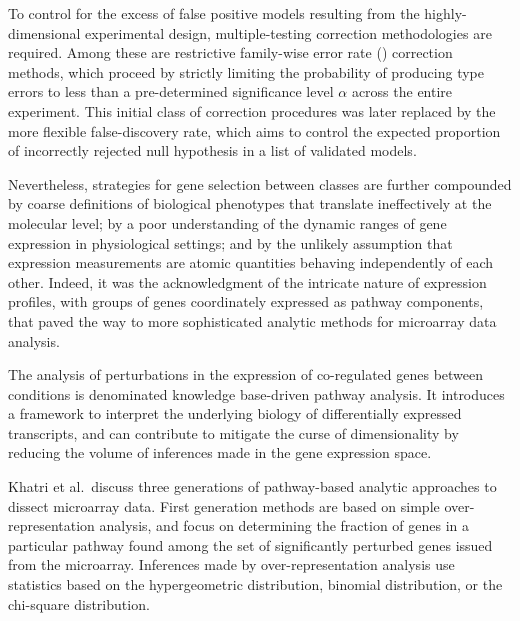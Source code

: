 To control for the excess of false positive models resulting from the
highly-dimensional experimental design, multiple-testing correction
methodologies are required.  Among these are restrictive family-wise error rate
() correction methods, which proceed by strictly limiting the
probability of producing type  errors to less than a pre-determined
significance level $\alpha$ across the entire experiment.  This initial class of
correction procedures was later replaced by the more flexible false-discovery
rate,\cite{benjamini_controlling_1995} which aims to control the expected
proportion of incorrectly rejected null hypothesis in a list of validated
models.

Nevertheless, strategies for gene selection between classes are further
compounded by coarse definitions of biological phenotypes that translate
ineffectively at the molecular level;\cite{piatetsky-shapiro_microarray_2003} by
a poor understanding of the dynamic ranges of gene expression in physiological
settings;\cite{nadimpally_novel_2003} and by the unlikely assumption that
expression measurements are atomic quantities behaving independently of each
other.\cite{piatetsky-shapiro_microarray_2003} Indeed, it was the
acknowledgment of the intricate nature of expression profiles, with groups of
genes coordinately expressed as pathway components, that paved the way to more
sophisticated analytic methods for microarray data analysis.

The analysis of perturbations in the expression of co-regulated genes between
conditions is denominated knowledge base-driven pathway analysis.  It introduces
a framework to interpret the underlying biology of differentially expressed
transcripts, and can contribute to mitigate the curse of dimensionality by
reducing the volume of inferences made in the gene expression space.

Khatri et al.~discuss three generations of pathway-based analytic approaches to
dissect microarray data.\cite{khatri_ten_2012} First generation methods are
based on simple over-representation analysis, and focus on determining the
fraction of genes in a particular pathway found among the set of significantly
perturbed genes issued from the microarray.  Inferences made by
over-representation analysis use statistics based on the hypergeometric
distribution, binomial distribution, or the chi-square distribution.

